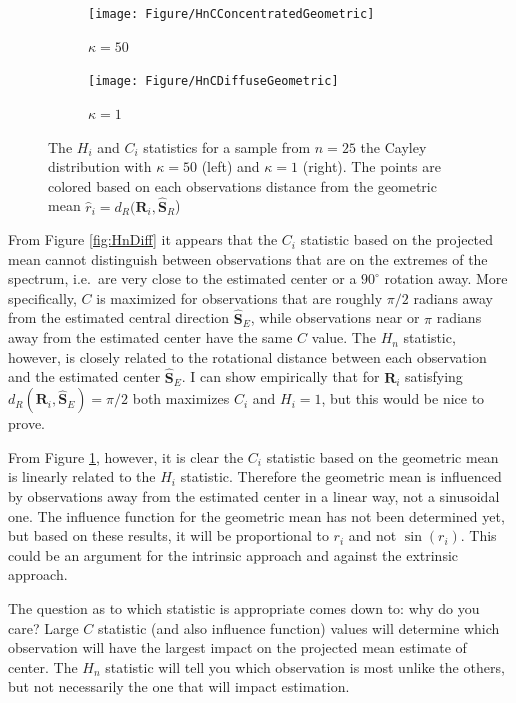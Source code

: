 \documentclass{article}\usepackage{graphicx, color}
\newcommand{\ProjMean}{{\widehat{\bm S}_{E}}}
\newcommand{\GeomMean}{{\widehat{\bm S}_{R}}}
\begin{document}
\begin{figure}
\centering
\begin{subfigure}[b]{0.45\textwidth}
        \texttt{[image: Figure/HnCConcentratedGeometric]}
        \caption{$\kappa=50$}
\end{subfigure}
\begin{subfigure}[b]{0.45\textwidth}
        \texttt{[image: Figure/HnCDiffuseGeometric]}
        \caption{$\kappa=1$}
        \label{fig:HnDiffGeom}
\end{subfigure}
\caption{The $H_i$ and $C_i$ statistics for a sample from $n=25$ the Cayley distribution with $\kappa=50$ (left) and $\kappa=1$ (right).  The points are colored based on each observations distance from the geometric mean $\hat r_i=d_R(\bm R_i,\GeomMean$)}
\label{fig:HnCGeom}
\end{figure}

From Figure \ref{fig:HnDiff} it appears that the $C_i$ statistic based on the projected mean cannot distinguish between observations that are on the extremes of the spectrum, i.e.~are very close to the estimated center or a $90^\circ$ rotation away.  More specifically, $C$ is maximized for observations that are roughly $\pi/2$ radians away from the estimated central direction $\ProjMean$, while observations near or $\pi$ radians away from the estimated center have the same $C$ value.  %
The $H_n$ statistic, however, is closely related to the rotational distance between each observation and the estimated center $\ProjMean$.  I can show empirically that for $\bm R_i$ satisfying $d_R(\bm R_i,\ProjMean)=\pi/2$ both maximizes $C_i$ and $H_i=1$, but this would be nice to prove. 

From Figure \ref{fig:HnDiffGeom}, however, it is clear the $C_i$ statistic based on the geometric mean is linearly related to the $H_i$ statistic.  Therefore the geometric mean is influenced by observations away from the estimated center in a linear way, not a sinusoidal one.  The influence function for the geometric mean has not been determined yet, but based on these results, it will be proportional to $r_i$ and not $\sin(r_i)$.  This could be an argument for the intrinsic approach and against the extrinsic approach.


The question as to which statistic is appropriate comes down to: why do you care?  Large $C$ statistic (and also influence function) values will determine which observation will have the largest impact on the projected mean estimate of center.  The $H_n$ statistic will tell you which observation is most unlike the others, but not necessarily the one that will impact estimation.
\end{document}
